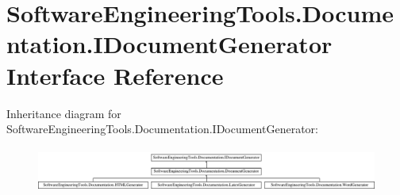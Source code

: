 \hypertarget{interface_software_engineering_tools_1_1_documentation_1_1_i_document_generator}{\section{Software\+Engineering\+Tools.\+Documentation.\+I\+Document\+Generator Interface Reference}
\label{interface_software_engineering_tools_1_1_documentation_1_1_i_document_generator}
}
Inheritance diagram for Software\+Engineering\+Tools.\+Documentation.\+I\+Document\+Generator\+:\begin{figure}[H]
\begin{center}
\leavevmode
\includegraphics[height=1.493333cm]{interface_software_engineering_tools_1_1_documentation_1_1_i_document_generator}
\end{center}
\end{figure}
